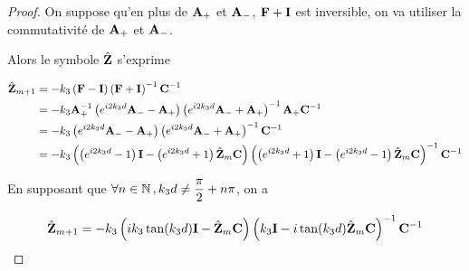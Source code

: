 \begin{proof}
            On suppose qu'en plus de \(\mathbf{A}_+\) et \(\mathbf{A}_-\), \(\mathbf{F} + \mathbf{I}\) est inversible, on va utiliser la commutativité de \(\mathbf{A}_+\) et \(\mathbf{A}_-\).

            Alors le symbole \(\hat {\mathbf{Z}}\) s'exprime

            \begin{align}
                \hat{\mathbf{Z}}_{m+1}
                &=-k_3\left(\mathbf{F} - \mathbf{I} \right)\left(\mathbf{F}+ \mathbf{I} \right)^{-1}\mathbf{C}^{-1}
                \\
                &=-k_3\mathbf{A}_+^{-1}\left(e^{i2 k_3 d}\mathbf{A}_- - \mathbf{A}_+ \right)\left(e^{i2 k_3 d}\mathbf{A}_- + \mathbf{A}_+ \right)^{-1}\mathbf{A}_+\mathbf{C}^{-1}
                \\
                &= -k_3\left( e^{i2 k_3 d} \mathbf{A}_- -  \mathbf{A}_+\right)
                \left( e^{i2 k_3 d} \mathbf{A}_- + \mathbf{A}_+ \right)^{-1}\mathbf{C}^{-1}
                \\
                &= -k_3\left(\left( e^{i2 k_3 d} - 1 \right)\mathbf{I} - \left( e^{i2 k_3 d} + 1 \right) \hat{\mathbf{Z}}_m\mathbf{C} \right)
                \left( \left( e^{i2 k_3 d} + 1 \right)\mathbf{I} - \left( e^{i2 k_3 d} - 1 \right)\hat{\mathbf{Z}}_m\mathbf{C} \right)^{-1}\mathbf{C}^{-1}
            \end{align}

            En supposant que \(\forall n \in \mathbb N \,, k_3d\not = \dfrac{\pi}{2}+n\pi\), on a

            \begin{equation}
                \hat{\mathbf{Z}}_{m+1} = -k_3\left(ik_3\tan(k_3 d)\mathbf{I} - \hat{\mathbf{Z}}_m\mathbf{C} \right)
                    \left( k_3\mathbf{I} - i\tan(k_3 d)\hat{\mathbf{Z}}_m\mathbf{C} \right)^{-1}\mathbf{C}^{-1}
            \end{equation}


        \end{proof}


